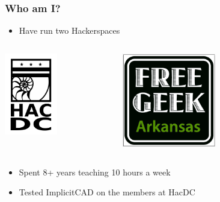 \documentclass{beamer}
\begin{document}

\begin{frame}
\frametitle{Who am I?}
\begin{itemize}
\item Have run two Hackerspaces
\end{itemize}
\begin{columns}
  \begin{column}{0.5\textwidth}
    \includegraphics[width=0.5\textwidth, right]{HacDC.svg.png}
  \end{column}
  \begin{column}{0.5\textwidth}
    \includegraphics[width=0.5\textwidth, left]{FreeGeekLogo.png}
  \end{column}
\end{columns}
\begin{itemize}
\item Spent 8+ years teaching 10 hours a week
\item Tested ImplicitCAD on the members at HacDC
\end{itemize}
\end{frame}
\end{document}
